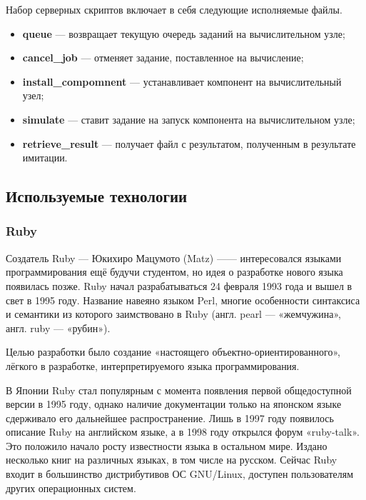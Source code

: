 Набор серверных скриптов включает в себя следующие исполняемые файлы.
\begin{itemize}
  \item \textbf{queue} --- возвращает текущую очередь заданий на вычислительном узле;   
  \item \textbf{cancel\_job} --- отменяет задание, поставленное на вычисление;
  \item \textbf{install\_compomnent} --- устанавливает компонент на вычислительный узел;
  \item \textbf{simulate} --- ставит задание на запуск компонента на вычислительном узле;
  \item \textbf{retrieve\_result} --- получает файл с результатом, полученным в результате имитации.
\end{itemize}

\subsection{Используемые технологии}

\subsubsection{Ruby}   

Создатель Ruby --- Юкихиро Мацумото (Matz) —--- интересовался языками программирования ещё будучи студентом, но идея о разработке нового языка появилась позже. Ruby начал разрабатываться 24 февраля 1993 года и вышел в свет в 1995 году. Название навеяно языком Perl, многие особенности синтаксиса и семантики из которого заимствовано в Ruby (англ. pearl — «жемчужина», англ. ruby — «рубин»).

Целью разработки было создание «настоящего объектно-ориентированного», лёгкого в разработке, интерпретируемого языка программирования.

В Японии Ruby стал популярным с момента появления первой общедоступной версии в 1995 году, однако наличие документации только на японском языке сдерживало его дальнейшее распространение. Лишь в 1997 году появилось описание Ruby на английском языке, а в 1998 году открылся форум «ruby-talk». Это положило начало росту известности языка в остальном мире. Издано несколько книг на различных языках, в том числе на русском. Сейчас Ruby входит в большинство дистрибутивов ОС GNU/Linux, доступен пользователям других операционных систем.
                                                                                                                           
